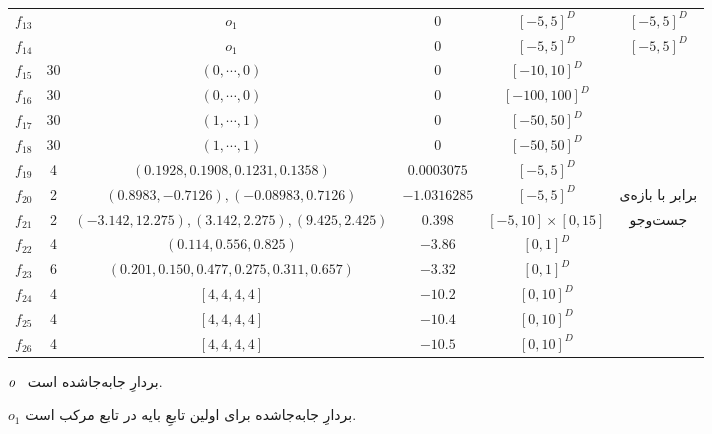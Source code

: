 \documentclass[12pt,a4paper]{article}
\theoremstyle{definition}
\theoremstyle{theorem}
\theoremstyle{definition}
\begin{document}
\begin{table}[!htbp]
\begin{adjustbox}{center}
\begin{tabular}{ c c c c c c}
\rowcolor{Gray}
$f_{13}$
&

&
$\mathit{o}_1$
&
$0$
&
$[-5,5]^D$
&
$[-5,5]^D$
\tabularnewline

\rowcolor{LGray}
$f_{14}$
&

&
$\mathit{o}_1$
&
$0$
&
$[-5,5]^D$
&
$[-5,5]^D$
\tabularnewline
\hline 

\rowcolor{Gray}
$f_{15}$
&
30
&
$(0, \cdots , 0)$
&
$0$
&
$[-10,10]^D$
&
\tabularnewline


\rowcolor{LGray}
$f_{16}$
&
30
&
$(0, \cdots , 0)$
&
$0$
&
$[-100,100]^D$
&
\tabularnewline

\rowcolor{Gray}
$f_{17}$
&
30
&
$(1, \cdots , 1)$
&
$0$
&
$[-50,50]^D$
&
\tabularnewline

\rowcolor{LGray}
$f_{18}$
&
30
&
$(1, \cdots , 1)$
&
$0$
&
$[-50,50]^D$
&
\tabularnewline

\rowcolor{Gray}
$f_{19}$
&
4
&
{\footnotesize$(0.1928, 0.1908 , 0.1231 , 0.1358)$}
&
$0.0003075$
&
$[-5,5]^D$
&
\tabularnewline

\rowcolor{LGray}
$f_{20}$
&
2
&
{\footnotesize$(0.8983,-0.7126),(-0.08983,0.7126)$}
&
$-1.0316285$
&
$[-5,5]^D$
&
برابر با بازه‌ی
\tabularnewline

\rowcolor{Gray}
$f_{21}$
&
2
&
{\scriptsize$(-3.142,12.275),(3.142,2.275),(9.425,2.425)$}
&
$0.398$
&
$[-5,10] \times [0,15]$
&
جست‌و‌جو
\tabularnewline

\rowcolor{LGray}
$f_{22}$
&
4
&
$(0.114, 0.556 , 0.825)$
&
$-3.86$
&
$[0,1]^D$
&
\tabularnewline

\rowcolor{Gray}
$f_{23}$
&
6
&
{\scriptsize{$(0.201, 0.150 , 0.477, 0.275, 0.311, 0.657)$}}
&
$-3.32$
&
$[0,1]^D$
&
\tabularnewline

\rowcolor{LGray}
$f_{24}$
&
4
&
$[4,4,4,4]$
&
$-10.2$
&
$[0,10]^D$
&
\tabularnewline

\rowcolor{Gray}
$f_{25}$
&
4
&
$[4,4,4,4]$
&
$-10.4$
&
$[0,10]^D$
&
\tabularnewline


\rowcolor{LGray}
$f_{26}$
&
4
&
$[4,4,4,4]$
&
$-10.5$
&
$[0,10]^D$
&
\tabularnewline

\hline
\end{tabular}
\label{tab:dims}
\end{adjustbox}
\begin{flushright}
\footnotesize{
${\mathit{o}\hphantom{_1}}$
بردارِ جابه‌جاشده‌ است.

$\mathit{o}_1$
بردارِ جابه‌جاشده برای اولین تابعِ بایه در تابع مرکب است.
}

\end{flushright}
\end{table}
\newpage 
\end{document}
